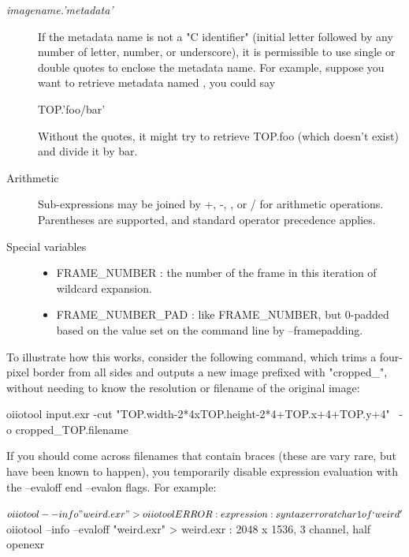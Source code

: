 \begin{description}
\item[{\emph{imagename.'metadata'}}]

If the metadata name is not a "C identifier" (initial letter followed by
any number of letter, number, or underscore), it is permissible to use
single or double quotes to enclose the metadata name. For example, suppose
you want to retrieve metadata named , you could say

\begin{code}
    {TOP.'foo/bar'}
\end{code}

\noindent Without the quotes, it might try to retrieve {\cf TOP.foo} (which
doesn't exist) and divide it by {\cf bar}.

\item[{Arithmetic}] Sub-expressions may be joined by {\cf +}, {\cf -},
{\cf *}, or {\cf /} for arithmetic operations. Parentheses are supported,
and standard operator precedence applies.

\item[{Special variables}] \spc

\begin{itemize}
\item {\cf FRAME_NUMBER} : the number of the frame in this iteration of
    wildcard expansion.
\item {\cf FRAME_NUMBER_PAD} : like {\cf FRAME_NUMBER}, but 0-padded based
    on the value set on the command line by {\cf --framepadding}.
\end{itemize}

\end{description}

To illustrate how this works, consider the following command, which trims
a four-pixel border from all sides and outputs a new image prefixed with
"cropped_", without needing to know the resolution or filename of the
original image:

\begin{smallcode}
    oiiotool input.exr -cut "{TOP.width-2*4}x{TOP.height-2*4}+{TOP.x+4}+{TOP.y+4}" \
        -o cropped_{TOP.filename}
\end{smallcode}

\NEW %
If you should come across filenames that contain braces (these are vary
rare, but have been known to happen), you temporarily disable expression
evaluation with the {\cf --evaloff} end {\cf --evalon} flags. For example:

\begin{smallcode}
    $ oiiotool --info "{weird}.exr"
    > oiiotool ERROR: expression : syntax error at char 1 of `weird'

    $ oiiotool --info --evaloff "{weird}.exr"
    > weird.exr            : 2048 x 1536, 3 channel, half openexr
\end{smallcode}

